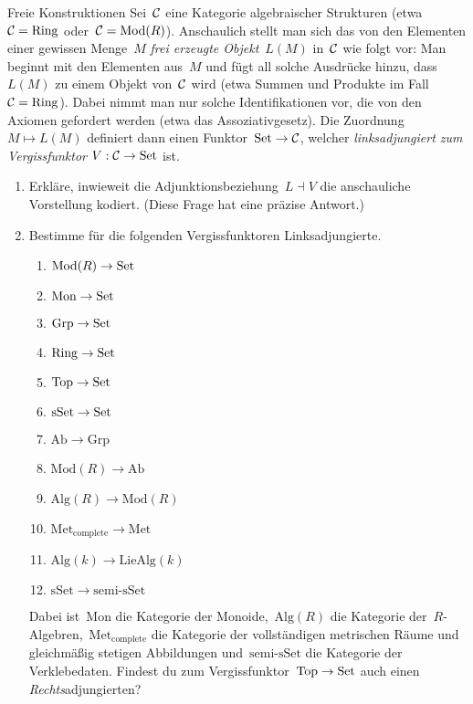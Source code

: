 \documentclass{uebblatt}
\begin{document}

\begin{aufgabe}{Freie Konstruktionen}
Sei~$\mathcal{C}$ eine Kategorie algebraischer Strukturen (etwa~$\mathcal{C} = \mathrm{Ring}$
oder~$\mathcal{C} = \mathrm{Mod}(R)$). Anschaulich stellt man sich das von den Elementen
einer gewissen Menge~$M$ \emph{frei erzeugte Objekt}~$L(M)$ in~$\mathcal{C}$ wie folgt
vor: Man beginnt mit den Elementen aus~$M$ und fügt all solche Ausdrücke hinzu,
dass~$L(M)$ zu einem Objekt von~$\mathcal{C}$ wird (etwa Summen und Produkte im Fall~$\mathcal{C}
= \mathrm{Ring}$). Dabei nimmt man nur solche Identifikationen vor, die von den
Axiomen gefordert werden (etwa das Assoziativgesetz). Die Zuordnung~$M \mapsto
L(M)$ definiert dann einen Funktor~$\mathrm{Set} \to \mathcal{C}$, welcher \emph{linksadjungiert
zum Vergissfunktor} $V : \mathcal{C} \to \mathrm{Set}$ ist.

\begin{enumerate}
\item Erkläre, inwieweit die Adjunktionsbeziehung~$L \dashv V$ die anschauliche
Vorstellung kodiert. (Diese Frage hat eine präzise Antwort.)
\item Bestimme für die folgenden Vergissfunktoren Linksadjungierte.
\begin{multicols}{2}
\renewcommand{\theenumii}{\arabic{enumii}}
\begin{enumerate}
\item $\mathrm{Mod}(R) \to \mathrm{Set}$
\item $\mathrm{Mon} \to \mathrm{Set}$
\item $\mathrm{Grp} \to \mathrm{Set}$
\item $\mathrm{Ring} \to \mathrm{Set}$
\item $\mathrm{Top} \to \mathrm{Set}$
\item $\mathrm{sSet} \to \mathrm{Set}$
\item $\mathrm{Ab} \to \mathrm{Grp}$
\item $\mathrm{Mod}(R) \to \mathrm{Ab}$
\item $\mathrm{Alg}(R) \to \mathrm{Mod}(R)$
\item $\mathrm{Met}_\mathrm{complete} \to \mathrm{Met}$
\item $\mathrm{Alg}(k) \to \mathrm{LieAlg}(k)$
\item $\mathrm{sSet} \to \text{semi-sSet}$
\end{enumerate}
\end{multicols}
Dabei ist~$\mathrm{Mon}$ die Kategorie der Monoide,~$\mathrm{Alg}(R)$ die Kategorie
der~$R$-Algebren,~$\mathrm{Met}_\mathrm{complete}$ die Kategorie der
vollständigen metrischen
Räume und gleichmäßig stetigen Abbildungen und~$\text{semi-sSet}$ die
Kategorie der Verklebedaten. Findest du zum Vergissfunktor~$\mathrm{Top} \to
\mathrm{Set}$ auch einen \emph{Rechts}adjungierten?
\end{enumerate}
\end{aufgabe}
\end{document}
